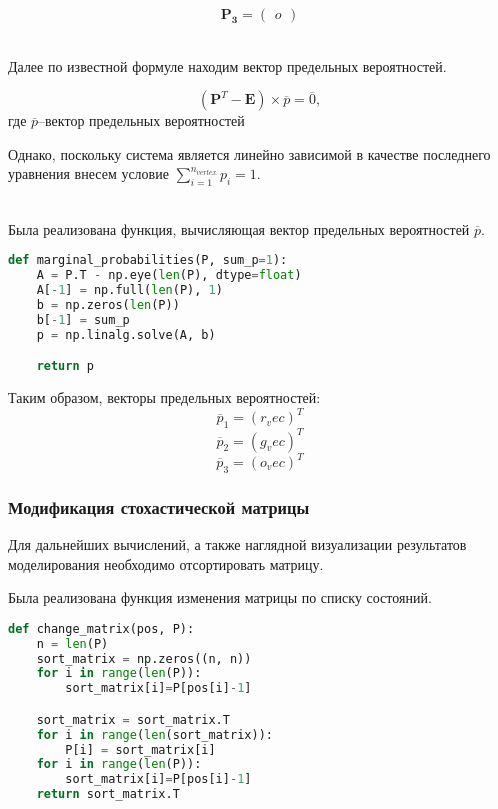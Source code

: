 $$\mathbf{P_{3}}=
\begin{pmatrix}
    {{ o }}
\end{pmatrix}$$

~\\

Далее по известной формуле находим вектор предельных вероятностей.

$$(\mathbf{P}^T-\mathbf{E})\times\overline{p}=\overline{0},$$
где $\overline{p}$--вектор предельных вероятностей

Однако, поскольку система является линейно зависимой в качестве последнего уравнения внесем условие $\sum\limits_{i=1}^{n_{vertex}}p_i=1$.

~\\

Была реализована функция, вычисляющая вектор предельных вероятностей  $\overline{p}$.

\begin{lstlisting}[language=python, label=prog,caption={\textit{расчет вектора предельных вероятностей}}]
def marginal_probabilities(P, sum_p=1):
    A = P.T - np.eye(len(P), dtype=float)
    A[-1] = np.full(len(P), 1)
    b = np.zeros(len(P))
    b[-1] = sum_p
    p = np.linalg.solve(A, b)

    return p
\end{lstlisting}

Таким образом, векторы предельных вероятностей:
$$\overline{p}_{1}=( {{ r_vec }} )^T$$
$$\overline{p}_{2}=( {{ g_vec }} )^T$$
$$\overline{p}_{3}=( {{ o_vec }} )^T$$

\subsubsection{Модификация стохастической матрицы}
Для дальнейших вычислений, а также наглядной визуализации результатов моделирования необходимо отсортировать матрицу.

Была реализована функция изменения матрицы по списку состояний.
 \begin{lstlisting}[language=python, label=prog, caption={\textit{Модификация матрицы}}]
def change_matrix(pos, P):
    n = len(P)
    sort_matrix = np.zeros((n, n))
    for i in range(len(P)):
        sort_matrix[i]=P[pos[i]-1]

    sort_matrix = sort_matrix.T
    for i in range(len(sort_matrix)):
        P[i] = sort_matrix[i]
    for i in range(len(P)):
        sort_matrix[i]=P[pos[i]-1]
    return sort_matrix.T
\end{lstlisting}


